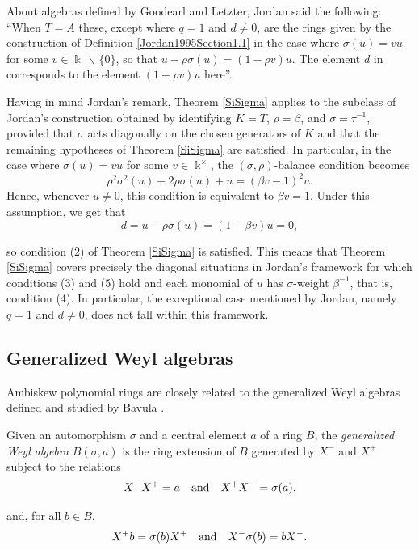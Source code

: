\documentclass{amsart}
\theoremstyle{definition}
\theoremstyle{remark}
\numberwithin{equation}{section}
\begin{document}
\begin{itemize}
About algebras defined by Goodearl and Letzter, Jordan \cite[Section 1.5]{Jordan1995} said the following: \textquotedblleft When $T=A$ these, except where $q = 1$ and $d\neq 0$, are the rings given by the construction of Definition \ref{Jordan1995Section1.1} in the case where $\sigma(u) = vu$ for some $v\in\Bbbk \, \backslash \, \{0\}$, so that $u - \rho \sigma(u) = (1 - \rho v)u$. The element $d$ in corresponds to the element $(1 - \rho v)u$ here\textquotedblright.

Having in mind Jordan's remark, Theorem \ref{SiSigma} applies to the subclass of Jordan's construction obtained by identifying $K=T$, $\rho=\beta$, and $\sigma=\tau^{-1}$, provided that $\sigma$ acts diagonally on the chosen generators of $K$ and that the remaining hypotheses of Theorem \ref{SiSigma} are satisfied. In particular, in the case where $\sigma(u)=vu$ for some $v\in\Bbbk^\times$, the $(\sigma,\rho)$-balance condition becomes
\[
\rho^2\sigma^2(u)-2\rho\sigma(u)+u=(\beta v-1)^2u.
\]
Hence, whenever $u\neq 0$, this condition is equivalent to $\beta v=1$. Under this assumption, we get that
\[
d=u-\rho\sigma(u)=(1-\beta v)u=0,
\]

so condition {\rm (2)} of Theorem \ref{SiSigma} is satisfied. This means that Theorem \ref{SiSigma} covers precisely the diagonal situations in Jordan's framework for which conditions {\rm (3)} and {\rm (5)} hold and each monomial of $u$ has $\sigma$-weight $\beta^{-1}$, that is, condition {\rm (4)}. In particular, the exceptional case mentioned by Jordan, namely $q=1$ and $d\neq 0$, does not fall within this framework. 
\end{itemize}


\subsection{Generalized Weyl algebras}

Ambiskew polynomial rings are closely related to the generalized Weyl algebras defined and studied by Bavula \cite{Bavula1992, BavulaJordan2001}. 

Given an automorphism $\sigma$ and a central element $a$ of a ring $B$, the {\em generalized Weyl algebra} $B(\sigma, a)$ is the ring extension of $B$ generated by $X^{-}$ and $X^{+}$ subject to the relations
\begin{equation}
   X^{-} X^{+} = a \quad {\rm and} \quad  X^{+} X^{-} = \sigma(a), 
\end{equation}

and, for all $b\in B$, 
\begin{equation}
X^{+} b = \sigma(b) X^{+} \quad {\rm and} \quad X^{-} \sigma(b) = bX^{-}.
\end{equation}
\end{document}
